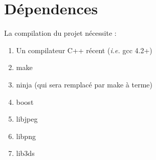 \section{Dépendences}
La compilation du projet nécessite :
\begin{enumerate}
  \item Un compilateur C++ récent (\textsl{i.e.} gcc 4.2+)
  \item make
  \item ninja (qui sera remplacé par make à terme)
  \item boost
  \item libjpeg
  \item libpng
  \item lib3ds
\end{enumerate}
